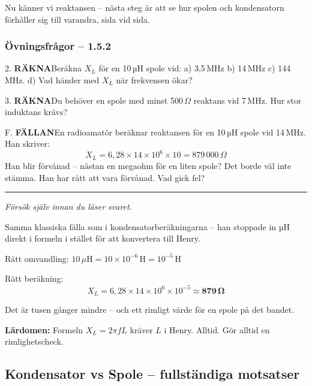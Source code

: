 \documentclass[a4paper,11pt,twoside]{book}
\newcommand{\qrakna}{\colorbox{bluepale}{\textcolor{bluedark}{\headingfont\bfseries\tiny RÄKNA}}}
\newcommand{\qfallan}{\colorbox{ljusbrun}{\textcolor{kakao}{\headingfont\bfseries\tiny FÄLLAN}}}
\begin{document}
Nu känner vi reaktansen -- nästa steg är att se hur 
spolen och kondensatorn förhåller sig till varandra, 
sida vid sida.

\subsubsection*{Övningsfrågor -- 1.5.2}

\begin{qblock}{2.}
\qrakna\quad Beräkna $X_L$ för en 10\,µH spole vid: 
a) 3,5\,MHz \quad b) 14\,MHz \quad c) 144\,MHz. \quad 
d) Vad händer med $X_L$ när frekvensen ökar?
\end{qblock}

\begin{qblock}{3.}
\qrakna\quad Du behöver en spole med minst 500\,$\Omega$ 
reaktans vid 7\,MHz. Hur stor induktans krävs?
\end{qblock}

\begin{qblock}{F.}
\qfallan\quad En radioamatör beräknar reaktansen för en 
10\,µH spole vid 14\,MHz. Han skriver:
\[
X_L = 6{,}28 \times 14 \times 10^6 \times 10 = 879\,000\,\Omega
\]
Han blir förvånad -- nästan en megaohm för en liten 
spole? Det borde väl inte stämma. Han har rätt att 
vara förvånad. Vad gick fel?
\end{qblock}

\medskip
\noindent\rule{\textwidth}{0.4pt}
{\small\itshape Försök själv innan du läser svaret.}
\medskip

\begin{worked}[title={Lösning -- Fallgropsfråga 1.5.2\,F}]
Samma klassiska fälla som i kondensatorberäkningarna 
-- han stoppade in µH direkt i formeln i stället för 
att konvertera till Henry.

Rätt omvandling: $10\,\mu\text{H} = 10 \times 10^{-6}\,\text{H} = 10^{-5}\,\text{H}$

Rätt beräkning:
\[ X_L = 6{,}28 \times 14 \times 10^6 \times 10^{-5} \approx \mathbf{879\,\Omega} \]

Det är tusen gånger mindre -- och ett rimligt värde 
för en spole på det bandet.

\textbf{Lärdomen:} Formeln $X_L = 2\pi fL$ kräver 
$L$ i Henry. Alltid. Gör alltid en rimlighetscheck.
\end{worked}

\subsection{Kondensator vs Spole -- fullständiga motsatser}
\end{document}
